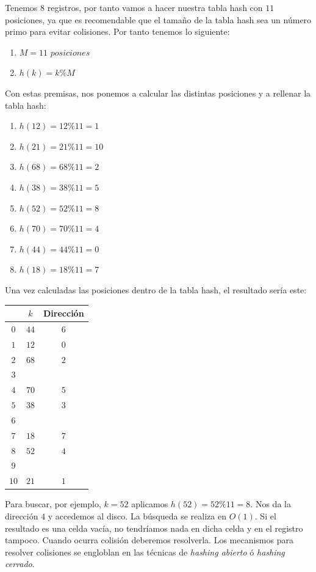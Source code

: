 \documentclass[10pt,a4paper,spanish]{report}
\begin{document}
\noindent
Tenemos $8$ registros, por tanto vamos a hacer nuestra tabla hash con $11$ posiciones, ya que es recomendable que el tamaño de la tabla hash sea un número primo para evitar colisiones. Por tanto tenemos lo siguiente:
\begin{enumerate}[$\bullet$]
      \item $M = 11$ $posiciones$
      \item $h(k) = k \% M$
\end{enumerate}

\noindent
Con estas premisas, nos ponemos a calcular las distintas posiciones y a rellenar la tabla hash:
\begin{enumerate}[$\bullet$]
      \item $h(12) = 12 \% 11 = 1$
      \item $h(21) = 21 \% 11 = 10$
      \item $h(68) = 68 \% 11 = 2$
      \item $h(38) = 38 \% 11 = 5$
      \item $h(52) = 52 \% 11 = 8$
      \item $h(70) = 70 \% 11 = 4$
      \item $h(44) = 44 \% 11 = 0$
      \item $h(18) = 18 \% 11 = 7$
\end{enumerate}

\noindent
Una vez calculadas las posiciones dentro de la tabla hash, el resultado sería este:

\begin{center}
\begin{tabular}{| c | c | c |}
\hline
& $k$ & Dirección \\
\hline
$0$ & $44$ & $6$ \\
$1$ & $12$ & $0$ \\
$2$ & $68$ & $2$ \\
$3$ & & \\
$4$ & $70$ & $5$ \\
$5$ & $38$ & $3$ \\
$6$ & & \\
$7$ & $18$ & $7$ \\
$8$ & $52$ & $4$ \\
$9$ & & \\
$10$ & $21$ & $1$ \\
\hline
\end{tabular}
\end{center}

\noindent
Para buscar, por ejemplo, $k=52$ aplicamos $h(52) = 52 \% 11 = 8$. Nos da la dirección $4$ y accedemos al disco. La búsqueda se realiza en $O(1)$.
Si el resultado es una celda vacía, no tendríamos nada en dicha celda y en el registro tampoco.
Cuando ocurra colisión deberemos resolverla. Los mecanismos para resolver colisiones se engloblan en las técnicas de  \textit{\textcolor[rgb]{0.3,0.4,0.8}{hashing abierto}} ó \textit{\textcolor[rgb]{0.3,0.4,0.8}{hashing cerrado}}.
\end{document}
